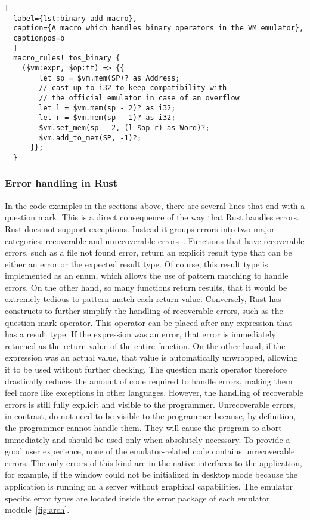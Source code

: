 \begin{lstlisting}[
  label={lst:binary-add-macro},
  caption={A macro which handles binary operators in the VM emulator},
  captionpos=b
  ]
  macro_rules! tos_binary {
    ($vm:expr, $op:tt) => {{
        let sp = $vm.mem(SP)? as Address;
        // cast up to i32 to keep compatibility with
        // the official emulator in case of an overflow
        let l = $vm.mem(sp - 2)? as i32;
        let r = $vm.mem(sp - 1)? as i32;
        $vm.set_mem(sp - 2, (l $op r) as Word)?;
        $vm.add_to_mem(SP, -1)?;
      }};
  }
\end{lstlisting}

\subsubsection{Error handling in Rust}
In the code examples in the sections above, there are several lines that end with a question mark. This is a direct consequence of the way that Rust handles errors.
Rust does not support exceptions. Instead it groups errors into two major categories: recoverable and unrecoverable errors~\cite[Chapter~9]{klabnik2019rust}.
Functions that have recoverable errors, such as a file not found error, return an explicit result type that can be either an error or the expected result type.
Of course, this result type is implemented as an enum, which allows the use of pattern matching to handle errors.
On the other hand, so many functions return results, that it would be extremely tedious to pattern match each return value.
Conversely, Rust has constructs to further simplify the handling of recoverable errors, such as the question mark operator.
This operator can be placed after any expression that has a result type. If the expression was an error, that error is immediately returned as the return value of the entire function. On the other hand, if the expression was an actual value, that value is automatically unwrapped, allowing it to be used without further checking.
The question mark operator therefore drastically reduces the amount of code required to handle errors, making them feel more like exceptions in other languages. However, the handling of recoverable errors is still fully explicit and visible to the programmer.
Unrecoverable errors, in contrast, do not need to be visible to the programmer because, by definition, the programmer cannot handle them.
They will cause the program to abort immediately and should be used only when absolutely necessary.
To provide a good user experience, none of the emulator-related code contains unrecoverable errors. The only errors of this kind are in the native interfaces to the application, for example, if the window could not be initialized in desktop mode because the application is running on a server without graphical capabilities.
The emulator specific error types are located inside the error package of each emulator module~\ref{fig:arch}.

